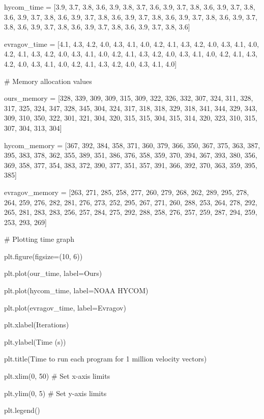 hycom\_time = {[}3.9, 3.7, 3.8, 3.6, 3.9, 3.8, 3.7, 3.6, 3.9, 3.7, 3.8,
3.6, 3.9, 3.7, 3.8, 3.6, 3.9, 3.7, 3.8, 3.6, 3.9, 3.7, 3.8, 3.6, 3.9,
3.7, 3.8, 3.6, 3.9, 3.7, 3.8, 3.6, 3.9, 3.7, 3.8, 3.6, 3.9, 3.7, 3.8,
3.6, 3.9, 3.7, 3.8, 3.6, 3.9, 3.7, 3.8, 3.6{]}

evragov\_time = {[}4.1, 4.3, 4.2, 4.0, 4.3, 4.1, 4.0, 4.2, 4.1, 4.3,
4.2, 4.0, 4.3, 4.1, 4.0, 4.2, 4.1, 4.3, 4.2, 4.0, 4.3, 4.1, 4.0, 4.2,
4.1, 4.3, 4.2, 4.0, 4.3, 4.1, 4.0, 4.2, 4.1, 4.3, 4.2, 4.0, 4.3, 4.1,
4.0, 4.2, 4.1, 4.3, 4.2, 4.0, 4.3, 4.1, 4.0{]}

\# Memory allocation values

ours\_memory = {[}328, 339, 309, 309, 315, 309, 322, 326, 332, 307, 324,
311, 328, 317, 325, 324, 347, 328, 345, 304, 324, 317, 318, 318, 329,
318, 341, 344, 329, 343, 309, 310, 350, 322, 301, 321, 304, 320, 315,
315, 304, 315, 314, 320, 323, 310, 315, 307, 304, 313, 304{]}

hycom\_memory = {[}367, 392, 384, 358, 371, 360, 379, 366, 350, 367,
375, 363, 387, 395, 383, 378, 362, 355, 389, 351, 386, 376, 358, 359,
370, 394, 367, 393, 380, 356, 369, 358, 377, 354, 383, 372, 390, 377,
351, 357, 391, 366, 392, 370, 363, 359, 395, 385{]}

evragov\_memory = {[}263, 271, 285, 258, 277, 260, 279, 268, 262, 289,
295, 278, 264, 259, 276, 282, 281, 276, 273, 252, 295, 267, 271, 260,
288, 253, 264, 278, 292, 265, 281, 283, 283, 256, 257, 284, 275, 292,
288, 258, 276, 257, 259, 287, 294, 259, 253, 293, 269{]}

\# Plotting time graph

plt.figure(figsize=(10, 6))

plt.plot(our\_time, label=\textquotesingle Ours\textquotesingle)

plt.plot(hycom\_time, label=\textquotesingle NOAA HYCOM\textquotesingle)

plt.plot(evragov\_time, label=\textquotesingle Evragov\textquotesingle)

plt.xlabel(\textquotesingle Iterations\textquotesingle)

plt.ylabel(\textquotesingle Time (s)\textquotesingle)

plt.title(\textquotesingle Time to run each program for 1 million
velocity vectors\textquotesingle)

plt.xlim(0, 50) \# Set x-axis limits

plt.ylim(0, 5) \# Set y-axis limits

plt.legend()

